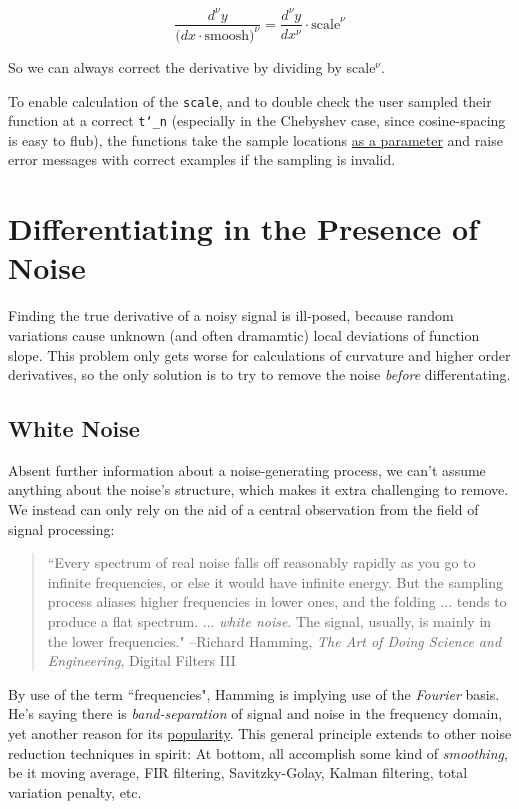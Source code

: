 \documentclass[10pt]{article}
\begin{document}
$$\frac{d^\nu y}{\big( dx \cdot \text{smoosh})^\nu} = \frac{d^\nu y}{dx^\nu} \cdot \text{scale}^\nu$$

\noindent So we can always correct the derivative by dividing by scale$^\nu$.

To enable calculation of the \texttt{scale}, and to double check the user sampled their function at a correct \texttt{t\char`_n} (especially in the Chebyshev case, since cosine-spacing is easy to flub), the functions take the sample locations \href{https://pavelkomarov.com/spectral-derivatives/specderiv.html}{as a parameter} and raise error messages with correct examples if the sampling is invalid.

\section{Differentiating in the Presence of Noise}

Finding the true derivative of a noisy signal is ill-posed, because random variations cause unknown (and often dramamtic) local deviations of function slope. This problem only gets worse for calculations of curvature and higher order derivatives, so the only solution is to try to remove the noise \textit{before} differentating.

\subsection{White Noise}

Absent further information about a noise-generating process, we can't assume anything about the noise's structure, which makes it extra challenging to remove. We instead can only rely on the aid of a central observation from the field of signal processing:

\begin{quotation}
``Every spectrum of real noise falls off reasonably rapidly as you go to infinite frequencies, or else it would have infinite energy. But the sampling process aliases higher frequencies in lower ones, and the folding ... tends to produce a flat spectrum. ... \textit{white noise}. The signal, usually, is mainly in the lower frequencies." --Richard Hamming, \textit{The Art of Doing Science and Engineering}\cite{hamming}, Digital Filters III
\end{quotation}

By use of the term ``frequencies", Hamming is implying use of the \textit{Fourier} basis. He's saying there is \textit{band-separation} of signal and noise in the frequency domain, yet another reason for its \hyperref[whyfourier]{popularity}. This general principle extends to other noise reduction techniques in spirit: At bottom, all accomplish some kind of \textit{smoothing}, be it moving average, FIR filtering, Savitzky-Golay, Kalman filtering, total variation penalty, etc.
\end{document}
